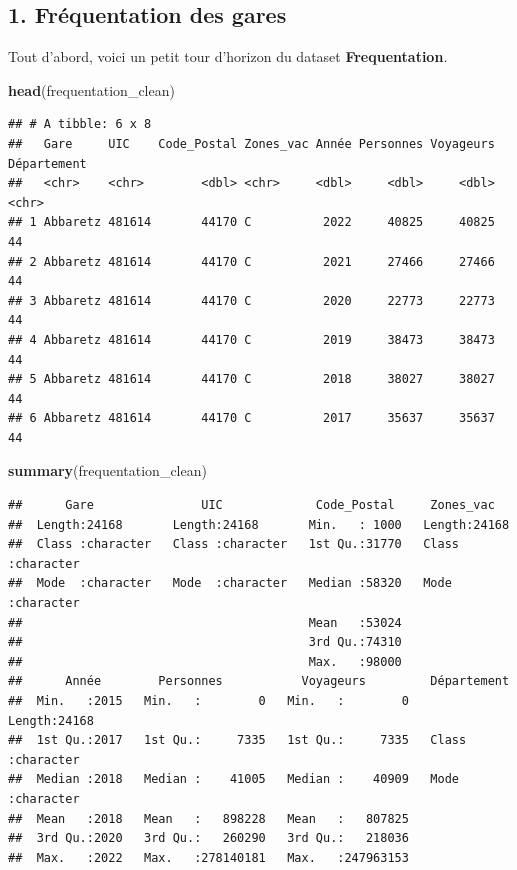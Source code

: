 \documentclass[
]{article}
\newenvironment{Shaded}{\begin{snugshade}}{\end{snugshade}}
\newcommand{\FunctionTok}[1]{\textcolor[rgb]{0.13,0.29,0.53}{\textbf{#1}}}
\newcommand{\NormalTok}[1]{#1}
\begin{document}
\hypertarget{fruxe9quentation-des-gares}{%
\subsection{1. Fréquentation des
gares}\label{fruxe9quentation-des-gares}}

Tout d'abord, voici un petit tour d'horizon du dataset
\textbf{Frequentation}.

\begin{Shaded}
\begin{Highlighting}[]
\FunctionTok{head}\NormalTok{(frequentation\_clean)}
\end{Highlighting}
\end{Shaded}

\begin{verbatim}
## # A tibble: 6 x 8
##   Gare     UIC    Code_Postal Zones_vac Année Personnes Voyageurs Département
##   <chr>    <chr>        <dbl> <chr>     <dbl>     <dbl>     <dbl> <chr>      
## 1 Abbaretz 481614       44170 C          2022     40825     40825 44         
## 2 Abbaretz 481614       44170 C          2021     27466     27466 44         
## 3 Abbaretz 481614       44170 C          2020     22773     22773 44         
## 4 Abbaretz 481614       44170 C          2019     38473     38473 44         
## 5 Abbaretz 481614       44170 C          2018     38027     38027 44         
## 6 Abbaretz 481614       44170 C          2017     35637     35637 44
\end{verbatim}

\begin{Shaded}
\begin{Highlighting}[]
\FunctionTok{summary}\NormalTok{(frequentation\_clean)}
\end{Highlighting}
\end{Shaded}

\begin{verbatim}
##      Gare               UIC             Code_Postal     Zones_vac        
##  Length:24168       Length:24168       Min.   : 1000   Length:24168      
##  Class :character   Class :character   1st Qu.:31770   Class :character  
##  Mode  :character   Mode  :character   Median :58320   Mode  :character  
##                                        Mean   :53024                     
##                                        3rd Qu.:74310                     
##                                        Max.   :98000                     
##      Année        Personnes           Voyageurs         Département       
##  Min.   :2015   Min.   :        0   Min.   :        0   Length:24168      
##  1st Qu.:2017   1st Qu.:     7335   1st Qu.:     7335   Class :character  
##  Median :2018   Median :    41005   Median :    40909   Mode  :character  
##  Mean   :2018   Mean   :   898228   Mean   :   807825                     
##  3rd Qu.:2020   3rd Qu.:   260290   3rd Qu.:   218036                     
##  Max.   :2022   Max.   :278140181   Max.   :247963153
\end{verbatim}
\end{document}
